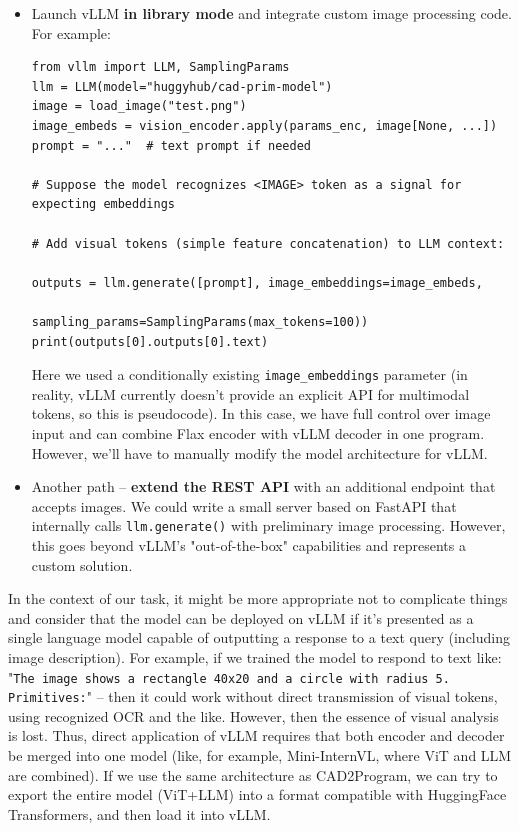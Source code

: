 \documentclass{article}
\begin{document}
\begin{itemize}
\item Launch vLLM \textbf{in library mode} and integrate custom image processing code. For example:
\begin{lstlisting}
from vllm import LLM, SamplingParams
llm = LLM(model="huggyhub/cad-prim-model")
image = load_image("test.png")
image_embeds = vision_encoder.apply(params_enc, image[None, ...])
prompt = "..."  # text prompt if needed

# Suppose the model recognizes <IMAGE> token as a signal for expecting embeddings

# Add visual tokens (simple feature concatenation) to LLM context:

outputs = llm.generate([prompt], image_embeddings=image_embeds, 
                      sampling_params=SamplingParams(max_tokens=100))
print(outputs[0].outputs[0].text)
\end{lstlisting}
Here we used a conditionally existing \texttt{image_embeddings} parameter (in reality, vLLM currently doesn't provide an explicit API for multimodal tokens, so this is pseudocode). In this case, we have full control over image input and can combine Flax encoder with vLLM decoder in one program. However, we'll have to manually modify the model architecture for vLLM.
\item Another path – \textbf{extend the REST API} with an additional endpoint that accepts images. We could write a small server based on FastAPI that internally calls \texttt{llm.generate()} with preliminary image processing. However, this goes beyond vLLM's "out-of-the-box" capabilities and represents a custom solution.
\end{itemize}

In the context of our task, it might be more appropriate not to complicate things and consider that the model can be deployed on vLLM if it's presented as a single language model capable of outputting a response to a text query (including image description). For example, if we trained the model to respond to text like: "\texttt{The image shows a rectangle 40x20 and a circle with radius 5. Primitives:}" – then it could work without direct transmission of visual tokens, using recognized OCR and the like. However, then the essence of visual analysis is lost. Thus, direct application of vLLM requires that both encoder and decoder be merged into one model (like, for example, Mini-InternVL, where ViT and LLM are combined). If we use the same architecture as CAD2Program, we can try to export the entire model (ViT+LLM) into a format compatible with HuggingFace Transformers, and then load it into vLLM.
\end{document}
